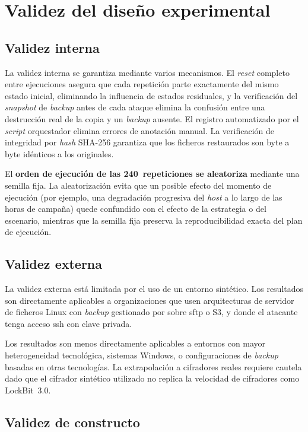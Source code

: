 \documentclass[../main.tex]{subfiles}
\begin{document}
\section{Validez del diseño experimental}

\subsection{Validez interna}

La validez interna se garantiza mediante varios mecanismos. El \emph{reset}
completo entre ejecuciones asegura que cada repetición parte exactamente del
mismo estado inicial, eliminando la influencia de estados residuales, y la
verificación del \emph{snapshot} de \emph{backup} antes de cada ataque elimina la
confusión entre una destrucción real de la copia y un \emph{backup} ausente. El
registro automatizado por el \emph{script} orquestador elimina errores de anotación
manual. La verificación de integridad por \emph{hash} SHA-256 garantiza que los
ficheros restaurados son byte a byte idénticos a los originales.

El \textbf{orden de ejecución de las 240~repeticiones se aleatoriza} mediante una
semilla fija. La aleatorización evita que un posible efecto del momento de ejecución
(por ejemplo, una degradación progresiva del \emph{host} a lo largo de las horas de
campaña) quede confundido con el efecto de la estrategia o del escenario, mientras
que la semilla fija preserva la reproducibilidad exacta del plan de ejecución.

\subsection{Validez externa}

La validez externa está limitada por el uso de un entorno sintético. Los resultados
son directamente aplicables a organizaciones que usen arquitecturas de servidor de
ficheros Linux con \emph{backup} gestionado por \restic sobre \gls{sftp} o S3, y
donde el atacante tenga acceso \gls{ssh} con clave privada.

Los resultados son menos directamente aplicables a entornos con mayor
heterogeneidad tecnológica, sistemas Windows, o configuraciones de \emph{backup}
basadas en otras tecnologías. La extrapolación a cifradores reales requiere cautela
dado que el cifrador sintético utilizado no replica la velocidad de cifradores
como LockBit~3.0.

\subsection{Validez de constructo}
\label{sec:validez-constructo}
\end{document}

